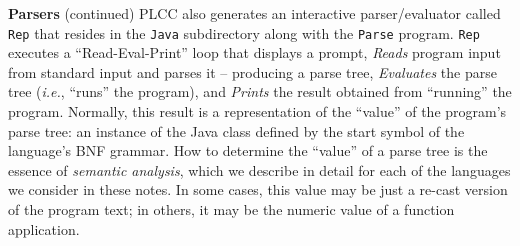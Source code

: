 \begin{minipage}[t]{\sw}
\slidenumber
\LARGE
{\bf Parsers} (continued)\exx
\LARGE
\emm\LightBox{\MYlonGrammarOnly}\exx
PLCC also generates an interactive parser/evaluator
called \verb'Rep' that resides in the \verb'Java' subdirectory
along with the \verb'Parse' program.
\verb'Rep' executes a ``Read-Eval-Print'' loop
that displays a prompt,
{\em Reads} program input from standard input and parses it --
producing a parse tree,
{\em Evaluates} the parse tree ({\em i.e.}, ``runs'' the program),
and {\em Prints} the result obtained
from ``running'' the program.
Normally, this result is a representation
of the ``value'' of the program's parse tree:
an instance of the Java class defined
by the start symbol of the language's BNF grammar.\exx
How to determine the ``value'' of a parse tree
is the essence of {\em semantic analysis},
which we describe in detail
for each of the languages we consider in these notes.
In some cases, this value may be just
a re-cast version of the program text;
in others, it may be the numeric value of a function application.\exx
\end{minipage}
\clearpage
